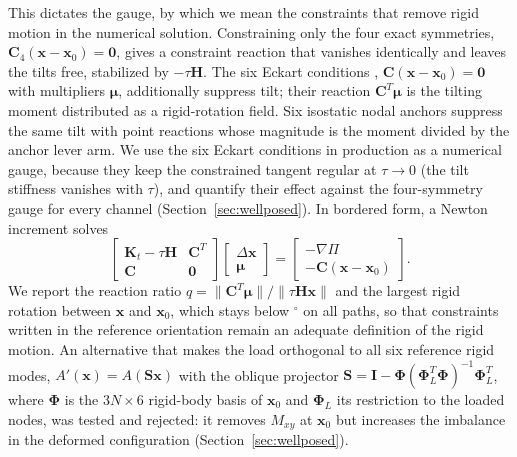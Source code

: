 \documentclass[preprint,12pt,a4paper]{elsarticle}
\newcommand{\x}{\mathbf{x}}
\newcommand{\Kt}{\mathbf{K}_t}
\newcommand{\Hm}{\mathbf{H}}
\newcommand{\C}{\mathbf{C}}
\begin{document}
This dictates the gauge, by which we mean the constraints that remove rigid motion in the numerical solution. Constraining only the four exact symmetries, $\C_4(\x-\x_0)=\mathbf{0}$, gives a constraint reaction that vanishes identically and leaves the tilts free, stabilized by $-\tau\Hm$. The six Eckart conditions \citep{eckart1935}, $\C(\x-\x_0)=\mathbf{0}$ with multipliers $\bm\mu$, additionally suppress tilt; their reaction $\C^{T}\bm\mu$ is the tilting moment distributed as a rigid-rotation field. Six isostatic nodal anchors suppress the same tilt with point reactions whose magnitude is the moment divided by the anchor lever arm. We use the six Eckart conditions in production as a numerical gauge, because they keep the constrained tangent regular at $\tau\to0$ (the tilt stiffness vanishes with $\tau$), and quantify their effect against the four-symmetry gauge for every channel (Section~\ref{sec:wellposed}). In bordered form, a Newton increment solves
\begin{equation}
\begin{bmatrix}\Kt-\tau\Hm & \C^{T}\\ \C & \mathbf{0}\end{bmatrix}
\begin{bmatrix}\Delta\x\\ \bm\mu\end{bmatrix}
=\begin{bmatrix}-\nabla\Pi\\ -\C(\x-\x_0)\end{bmatrix}.
\label{eq:bordered}
\end{equation}
We report the reaction ratio $q=\|\C^T\bm\mu\|/\|\tau\Hm\x\|$ and the largest rigid rotation between $\x$ and $\x_0$, which stays below $^\circ$ on all paths, so that constraints written in the reference orientation remain an adequate definition of the rigid motion. An alternative that makes the load orthogonal to all six reference rigid modes, $A'(\x)=A(\mathbf{S}\x)$ with the oblique projector $\mathbf{S}=\mathbf{I}-\bm\Phi(\bm\Phi_L^T\bm\Phi)^{-1}\bm\Phi_L^T$, where $\bm\Phi$ is the $3N\times6$ rigid-body basis of $\x_0$ and $\bm\Phi_L$ its restriction to the loaded nodes, was tested and rejected: it removes $M_{xy}$ at $\x_0$ but increases the imbalance in the deformed configuration (Section~\ref{sec:wellposed}).
\end{document}
